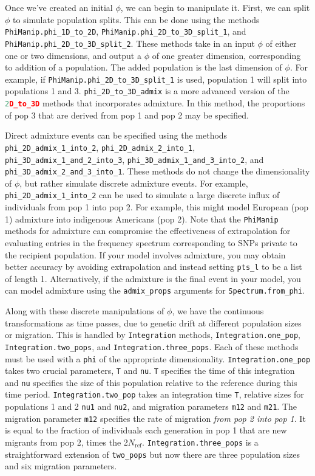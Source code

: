 \documentclass[12pt]{article}
\makeatletter
\newcommand{\Nref}{\ensuremath{N_\text{ref}}\xspace}
\newcommand{\py}[1]{\lstinline[language=Python, showstringspaces=False]@#1@}
\makeatother
\begin{document}
Once we've created an initial $\phi$, we can begin to manipulate it.
First, we can split $\phi$ to simulate population splits.
This can be done using the methods \py{PhiManip.phi_1D_to_2D}, \py{PhiManip.phi_2D_to_3D_split_1}, and \py{PhiManip.phi_2D_to_3D_split_2}.
These methods take in an input $\phi$ of either one or two dimensions, and output a $\phi$ of one greater dimension, corresponding to addition of a population.
The added population is the last dimension of $\phi$.
For example, if \py{PhiManip.phi_2D_to_3D_split_1} is used, population 1 will split into populations 1 and 3.
\py{phi_2D_to_3D_admix} is a more advanced version of the \py{2D_to_3D} methods that incorporates admixture.
In this method, the proportions of pop 3 that are derived from pop 1 and pop 2 may be specified.

Direct admixture events can be specified using the methods \py{phi_2D_admix_1_into_2}, \py{phi_2D_admix_2_into_1}, \py{phi_3D_admix_1_and_2_into_3}, \py{phi_3D_admix_1_and_3_into_2}, and \py{phi_3D_admix_2_and_3_into_1}.
These methods do not change the dimensionality of $\phi$, but rather simulate discrete admixture events.
For example, \py{phi_2D_admix_1_into_2} can be used to simulate a large discrete influx of individuals from pop 1 into pop 2.
For example, this might model European (pop 1) admixture into indigenous Americans (pop 2).
Note that the \py{PhiManip} methods for admixture can compromise the effectiveness of extrapolation for evaluating entries in the frequency spectrum corresponding to SNPs private to the recipient population.
If your model involves admixture, you may obtain better accuracy by avoiding extrapolation and instead setting \py{pts_l} to be a list of length 1.
Alternatively, if the admixture is the final event in your model, you can model admixture using the \py{admix_props} arguments for \py{Spectrum.from_phi}.

Along with these discrete manipulations of $\phi$, we have the continuous transformations as time passes, due to genetic drift at different population sizes or migration.
This is handled by \py{Integration} methods, \py{Integration.one_pop}, \py{Integration.two_pops}, and \py{Integration.three_pops}.
Each of these methods must be used with a \py{phi} of the appropriate dimensionality.
\py{Integration.one_pop} takes two crucial parameters, \py{T} and \py{nu}.
\py{T} specifies the time of this integration and \py{nu} specifies the size of this population relative to the reference during this time period.
\py{Integration.two_pop} takes an integration time \py{T}, relative sizes for populations 1 and 2 \py{nu1} and \py{nu2}, and migration parameters \py{m12} and \py{m21}.
The migration parameter \py{m12} specifies the rate of migration \emph{from pop 2 into pop 1}.
It is equal to the fraction of individuals each generation in pop 1 that are new migrants from pop 2, times the 2\Nref.
\py{Integration.three_pops} is a straightforward extension of \py{two_pops} but now there are three population sizes and six migration parameters.
\end{document}
